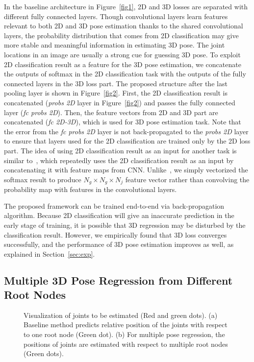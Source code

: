 \documentclass[runningheads]{llncs}
\begin{document}
In the baseline architecture in Figure~\ref{fig1}, 2D and 3D losses are separated with different fully connected layers. Though convolutional layers learn features relevant to both 2D and 3D pose estimation thanks to the shared convolutional layers, the probability distribution that comes from 2D classification may give more stable and meaningful information in estimating 3D pose. The joint locations in an image are usually a strong cue for guessing 3D pose. To exploit 2D classification result as a feature for the 3D pose estimation, we concatenate the outputs of softmax in the 2D classification task with the outputs of the fully connected layers in the 3D loss part. The proposed structure after the last pooling layer is shown in Figure~\ref{fig2}. First, the 2D classification result is concatenated (\textit{probs 2D} layer in Figure~\ref{fig2}) and passes the fully connected layer (\textit{fc probs 2D}). Then, the feature vectors from 2D and 3D part are concatenated (\textit{fc 2D-3D}), which is used for 3D pose estimation task. Note that the error from the \textit{fc probs 2D} layer is not back-propagated to the \textit{probs 2D} layer to ensure that layers used for the 2D classification are trained only by the 2D loss part. The idea of using 2D classification result as an input for another task is similar to~\cite{wei2016convolutional}, which repeatedly uses the 2D classification result as an input by concatenating it with feature maps from CNN. Unlike~\cite{wei2016convolutional}, we simply vectorized the softmax result to produce $N_g \times N_g \times N_j$ feature vector rather than convolving the probability map with features in the convolutional layers.

The proposed framework can be trained end-to-end via back-propagation algorithm. Because 2D classification will give an inaccurate prediction in the early stage of training, it is possible that 3D regression may be disturbed by the classification result. However, we empirically found that 3D loss converges successfully, and the performance of 3D pose estimation improves as well, as explained in Section~\ref{sec:exp}.

\subsection{Multiple 3D Pose Regression from Different Root Nodes}
\begin{figure}[t]
\centering
  \caption{Visualization of joints to be estimated (Red and green dots). (a) Baseline method predicts relative position of the joints with respect to one root node (Green dot). (b) For multiple pose regression, the positions of joints are estimated with respect to multiple root nodes (Green dots).}
\end{figure}
\end{document}
